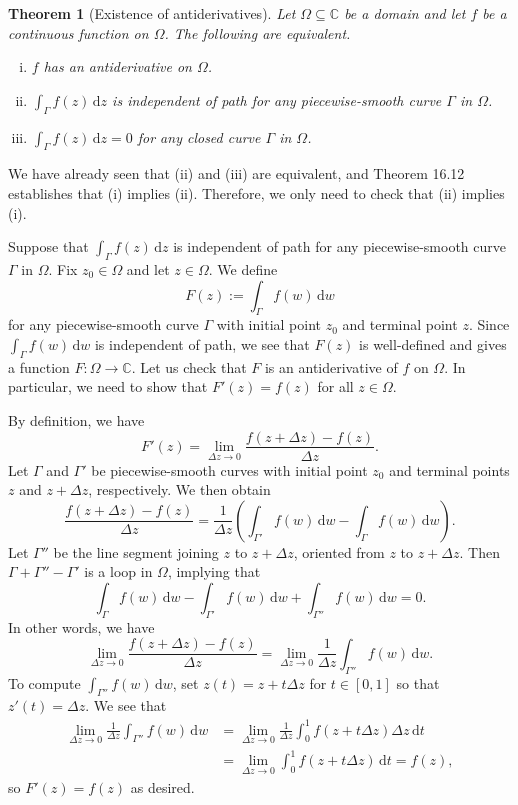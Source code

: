 \documentclass[10pt]{article}
\makeatletter
\newcommand{\C}{\mathbb{C}}
\newcommand{\dd}{\,\mathrm{d}}
\theoremstyle{newstyle}
\newtheorem{thm}{Theorem}[section]
\newenvironment{pf}[1][\proofname]{\par
  \pushQED{\qed}%
  \normalfont \topsep0\p@\relax
  \trivlist
  \item[\hskip\labelsep\scshape
  #1\@addpunct{.}]\ignorespaces
}{%
  \popQED\endtrivlist\@endpefalse
}
\makeatother
\begin{document}
\begin{thm}[Existence of antiderivatives]
Let $\Omega \subseteq \C$ be a domain and let $f$ be a continuous function on $\Omega$. The following
are equivalent.
\begin{enumerate}[(i)]
    \item $f$ has an antiderivative on $\Omega$.
    \item $\int_\Gamma f(z)\dd z$ is independent of path for any piecewise-smooth curve $\Gamma$ in $\Omega$.
    \item $\int_\Gamma f(z)\dd z = 0$ for any closed curve $\Gamma$ in $\Omega$. 
\end{enumerate}
\end{thm}
\begin{pf}
We have already seen that (ii) and (iii) are equivalent, and Theorem 16.12 establishes that 
(i) implies (ii). Therefore, we only need to check that (ii) implies (i). 

Suppose that $\int_\Gamma f(z)\dd z$ is independent of path for any piecewise-smooth curve $\Gamma$ in $\Omega$. Fix $z_0 \in \Omega$ and let $z \in \Omega$. We define 
\[ F(z) := \int_\Gamma f(w)\dd w \]
for any piecewise-smooth curve $\Gamma$ with initial point $z_0$ and terminal point $z$. 
Since $\int_\Gamma f(w)\dd w$ is independent of path, we see that $F(z)$ is well-defined 
and gives a function $F : \Omega \to \C$. Let us check that $F$ is an antiderivative of $f$ on 
$\Omega$. In particular, we need to show that $F'(z) = f(z)$ for all $z \in \Omega$. 

By definition, we have 
\[ F'(z) = \lim_{\Delta z \to 0} \frac{f(z + \Delta z) - f(z)}{\Delta z}. \]
Let $\Gamma$ and $\Gamma'$ be piecewise-smooth curves with initial point $z_0$ and terminal points 
$z$ and $z + \Delta z$, respectively. We then obtain 
\[ \frac{f(z + \Delta z) - f(z)}{\Delta z} = \frac{1}{\Delta z} \left( 
\int_{\Gamma'} f(w)\dd w - \int_\Gamma f(w)\dd w \right). \]
Let $\Gamma''$ be the line segment joining $z$ to $z + \Delta z$, oriented from $z$ to 
$z + \Delta z$. Then $\Gamma + \Gamma'' - \Gamma'$ is a loop in $\Omega$, implying that 
\[ \int_\Gamma f(w)\dd w - \int_{\Gamma'} f(w)\dd w + \int_{\Gamma''} f(w)\dd w = 0. \]
In other words, we have 
\[ \lim_{\Delta z \to 0} \frac{f(z + \Delta z) - f(z)}{\Delta z} = \lim_{\Delta z \to 0}
\frac{1}{\Delta z} \int_{\Gamma''} f(w)\dd w. \]
To compute $\int_{\Gamma''} f(w)\dd w$, set $z(t) = z+t\Delta z$ for $t \in [0, 1]$ so that 
$z'(t) = \Delta z$. We see that 
\begin{align*}
    \lim_{\Delta z \to 0}
    \frac{1}{\Delta z} \int_{\Gamma''} f(w)\dd w
    &= \lim_{\Delta z \to 0}
    \frac{1}{\Delta z} \int_0^1 f(z + t\Delta z) \Delta z \dd t \\
    &= \lim_{\Delta z \to 0} \int_0^1 f(z + t\Delta z) \dd t = f(z),
\end{align*}
so $F'(z) = f(z)$ as desired.
\end{pf}
\end{document}
